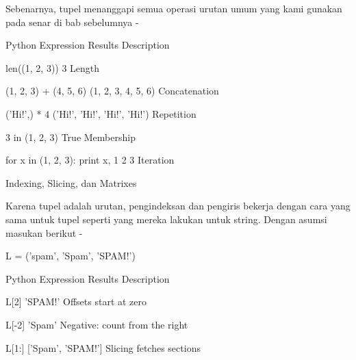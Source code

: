 Sebenarnya, tupel menanggapi semua operasi urutan umum yang kami gunakan pada senar di bab sebelumnya - \par
Python Expression \hspace*{0.5in} Results  \hspace*{0.5in} Description \par
len((1, 2, 3)) \hspace*{0.5in} 3 \hspace*{0.5in} Length \par
(1, 2, 3) + (4, 5, 6) \hspace*{0.5in} (1, 2, 3, 4, 5, 6) \hspace*{0.5in} Concatenation \par
('Hi!',) * 4 \hspace*{0.5in} ('Hi!', 'Hi!', 'Hi!', 'Hi!') \hspace*{0.5in} Repetition \par
3 in (1, 2, 3) \hspace*{0.5in} True \hspace*{0.5in} Membership \par
for x in (1, 2, 3): print x, \hspace*{0.5in} 1 2 3 \hspace*{0.5in} Iteration \par
Indexing, Slicing, dan Matrixes \par
Karena tupel adalah urutan, pengindeksan dan pengiris bekerja dengan cara yang sama untuk tupel seperti yang mereka lakukan untuk string. Dengan asumsi masukan berikut - \par
L = ('spam', 'Spam', 'SPAM!') \par
  \par
Python Expression \hspace*{0.5in} Results  \hspace*{0.5in} Description \par
L[2] \hspace*{0.5in} 'SPAM!' \hspace*{0.5in} Offsets start at zero \par
L[-2] \hspace*{0.5in} 'Spam' \hspace*{0.5in} Negative: count from the right \par
L[1:] \hspace*{0.5in} ['Spam', 'SPAM!'] \hspace*{0.5in} Slicing fetches sections \par
\vspace{12pt}
